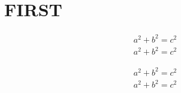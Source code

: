 \documentclass{../code/zlatex}
\begin{document}
\section{FIRST}
\lipsum[1]

\begin{remark}[REMARK]
  \lipsum[2][1-5]
  \begin{align}
    a^2 + b^2 = c^2
  \end{align}
  \lipsum[2][6-8]
  \begin{align*}
    a^2 + b^2 = c^2
  \end{align*}
\end{remark}

\lipsum[2-3]
\begin{proposition}[PROP]
  \lipsum[2][1-5]
  \begin{align}
    a^2 + b^2 = c^2
  \end{align}
  \lipsum[2][6-8]
  \begin{align*}
    a^2 + b^2 = c^2
  \end{align*}
\end{proposition}
\end{document}

